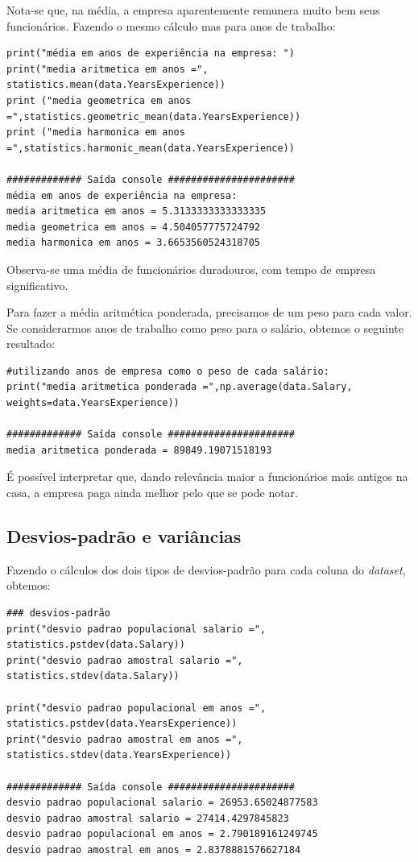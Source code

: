 \documentclass{article}
\begin{document}
Nota-se que, na média, a empresa aparentemente remunera muito bem seus funcionários. 
Fazendo o mesmo cálculo mas para anos de trabalho:

\begin{verbatim}
print("média em anos de experiência na empresa: ")
print("media aritmetica em anos =", statistics.mean(data.YearsExperience))
print ("media geometrica em anos =",statistics.geometric_mean(data.YearsExperience))
print ("media harmonica em anos =",statistics.harmonic_mean(data.YearsExperience))

############# Saída console ######################
média em anos de experiência na empresa: 
media aritmetica em anos = 5.3133333333333335
media geometrica em anos = 4.504057775724792 
media harmonica em anos = 3.6653560524318705
\end{verbatim}

Observa-se uma média de funcionários duradouros, com tempo de empresa significativo.

Para fazer a média aritmética ponderada, precisamos de um peso para cada valor. Se considerarmos anos de trabalho como peso para o salário, obtemos o seguinte resultado:

\begin{verbatim}
#utilizando anos de empresa como o peso de cada salário:
print("media aritmetica ponderada =",np.average(data.Salary, weights=data.YearsExperience))

############# Saída console ######################
media aritmetica ponderada = 89849.19071518193
\end{verbatim}

É possível interpretar que, dando relevância maior a funcionários mais antigos na casa, a empresa paga ainda melhor pelo que se pode notar.

\subsection{Desvios-padrão e variâncias}
Fazendo o cálculos dos dois tipos de desvios-padrão para cada coluna do {\it dataset}, obtemos:

\begin{verbatim}
### desvios-padrão
print("desvio padrao populacional salario =", statistics.pstdev(data.Salary))
print("desvio padrao amostral salario =", statistics.stdev(data.Salary))

print("desvio padrao populacional em anos =", statistics.pstdev(data.YearsExperience))
print("desvio padrao amostral em anos =", statistics.stdev(data.YearsExperience))

############# Saída console ######################
desvio padrao populacional salario = 26953.65024877583
desvio padrao amostral salario = 27414.4297845823     
desvio padrao populacional em anos = 2.790189161249745
desvio padrao amostral em anos = 2.8378881576627184   
\end{verbatim}
\end{document}

